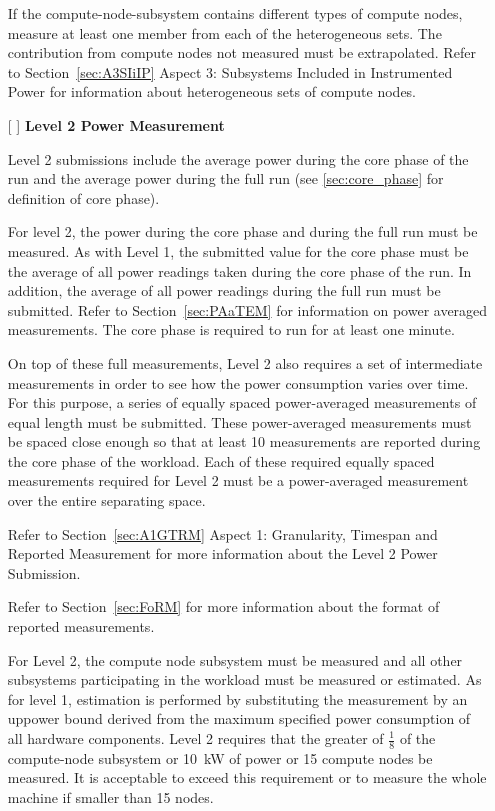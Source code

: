 \begin{itemize}
If the compute-node-subsystem contains different types of compute nodes, measure at least one member from each of the heterogeneous sets. The contribution from compute nodes not measured must be extrapolated. Refer to 
Section~\ref{sec:A3SIiIP} Aspect 3: Subsystems Included in Instrumented Power for information about heterogeneous sets of compute nodes.

\newpage
\item[{[ ]}]
\textbf{Level 2 Power Measurement}

Level 2 submissions include the average power during the core phase of the run and the average power during the full run (see \ref{sec:core_phase} for definition of core phase).

For level 2, the power during the core phase and during the full run must be measured.
As with Level 1, the submitted value for the core phase must be the average of all power readings taken during the core phase of the run.
In addition, the average of all power readings during the full run must be submitted.
Refer to Section~\ref{sec:PAaTEM} for information on power averaged measurements.
The core phase is required to run for at least one minute.

On top of these full measurements, Level 2 also requires a set of intermediate measurements in order to see how the power consumption varies over time.
For this purpose, a series of equally spaced power-averaged measurements of equal length must be submitted.
These power-averaged measurements must be spaced close enough so that at least 10 measurements are reported during the core phase of the workload.
Each of these required equally spaced measurements required for Level 2 must be a power-averaged measurement over the entire separating space. 

Refer to Section~\ref{sec:A1GTRM} Aspect 1: Granularity, Timespan and Reported Measurement for more information about the Level 2 Power Submission. 

Refer to Section~\ref{sec:FoRM} for more information about the format of reported measurements.

For Level 2, the compute node subsystem must be measured and all other subsystems participating in the workload must be measured or estimated.
As for level 1, estimation is performed by substituting the measurement by an uppower bound derived from the maximum specified power consumption of all hardware components.
Level 2 requires that the greater of $\frac{1}{8}$ of the compute-node subsystem or 10~kW of power or 15 compute nodes be measured.
It is acceptable to exceed this requirement or to measure the whole machine if smaller than 15 nodes.


\end{itemize}
